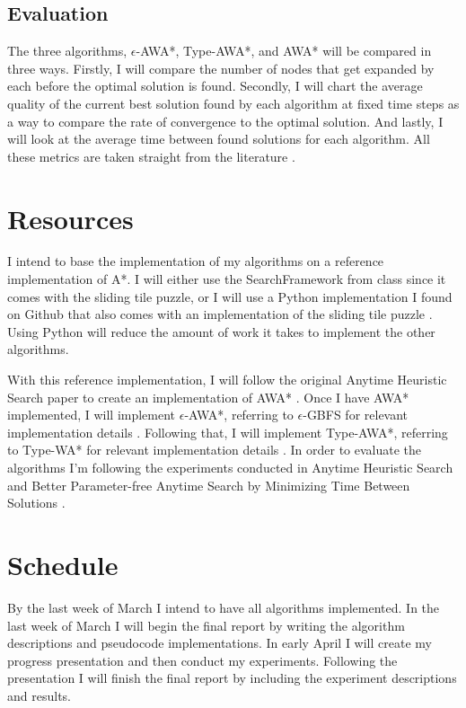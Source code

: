 \documentclass{llncs}
\begin{document}
\subsection{Evaluation}
The three algorithms, $\epsilon$-AWA*, Type-AWA*, and AWA* will be compared in three ways. Firstly, I will compare the number of nodes that get expanded by each before the optimal solution is found. Secondly, I will chart the average quality of the current best solution found by each algorithm at fixed time steps as a way to compare the rate of convergence to the optimal solution. And lastly, I will look at the average time between found solutions for each algorithm. All these metrics are taken straight from the literature \cite{thayer2012better}\cite{hansen2007anytime}.


\section{Resources}
I intend to base the implementation of my algorithms on a reference implementation of A*. I will either use the SearchFramework from class since it comes with the sliding tile puzzle, or I will use a Python implementation I found on Github that also comes with an implementation of the sliding tile puzzle \cite{pip-astar}. Using Python will reduce the amount of work it takes to implement the other algorithms. 

With this reference implementation, I will follow the original Anytime Heuristic Search paper to create an implementation of AWA* \cite{hansen2007anytime}. Once I have AWA* implemented, I will implement $\epsilon$-AWA*, referring to $\epsilon$-GBFS for relevant implementation details \cite{valenzano2016completeness}\cite{valenzano2014comparison}. Following that, I will implement Type-AWA*, referring to Type-WA* for relevant implementation details \cite{cohen2021type}. In order to evaluate the algorithms I'm following the experiments conducted in Anytime Heuristic Search \cite{hansen2007anytime} and Better Parameter-free Anytime Search by Minimizing Time Between Solutions \cite{thayer2012better}.

\section{Schedule}
By the last week of March I intend to have all algorithms implemented. In the last week of March I will begin the final report by writing the algorithm descriptions and pseudocode implementations. In early April I will create my progress presentation and then conduct my experiments. Following the presentation I will finish the final report by including the experiment descriptions and results.


\newpage


\end{document}
